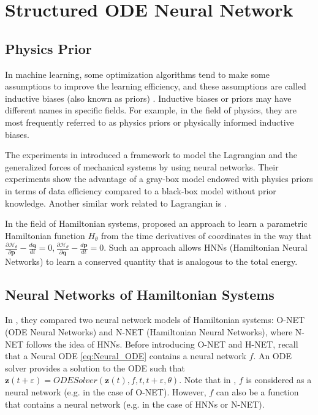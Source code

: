 \documentclass[
	parskip, 			   %
	twoside, 			   %
	DIV=14, 			   %
	BCOR=15.0mm, 		   %
	headsepline, 		   %
	open=right, 		   %
	captions=tableheading, %
	bibliography=totoc,    %
	numbers=noenddot       %
]{scrreprt}
\begin{document}
\clearpage
\chapter{Structured ODE Neural Network}
\label{ch:chapter6}
\section{Physics Prior}
In machine learning, some optimization algorithms tend to make some assumptions to improve the learning efficiency, and these assumptions are called inductive biases (also known as priors) \cite{mitchell1997machine}. Inductive biases or priors may have different names in specific fields. For example, in the field of physics, they are most frequently referred to as physics priors or physically informed inductive biases.

The experiments in \cite{gupta2019general} introduced a framework to model the Lagrangian and the generalized forces of mechanical systems by using neural networks. Their experiments show the advantage of a gray-box model endowed with physics priors in terms of data efficiency compared to a black-box model without prior knowledge. Another similar work related to Lagrangian is \cite{lutter2019deep}.

In the field of Hamiltonian systems, \cite{greydanus2019hamiltonian} proposed an approach to learn a parametric Hamiltonian function $H_{\theta}$ from the time derivatives of coordinates in the way that $\frac{\partial \mathcal{H}_{\theta}}{\partial \mathbf{p}} - \frac{d\mathbf{q}}{dt} = 0, \frac{\partial \mathcal{H}_{\theta}}{\partial \mathbf{q}} - \frac{d\mathbf{p}}{dt} = 0 $. Such an approach allows HNNs (Hamiltonian Neural Networks) to learn a conserved quantity that is analogous to the total energy.

\section{Neural Networks of Hamiltonian Systems}
In \cite{chen2019symplectic}, they compared two neural network models of Hamiltonian systems: O-NET (ODE Neural Networks) and N-NET (Hamiltonian Neural Networks), where N-NET follows the idea of HNNs. 
Before introducing O-NET and H-NET, recall that a Neural ODE \ref{eq:Neural_ODE} contains a neural network $f$. An ODE solver provides a solution to the ODE such that $\mathbf{z}(t+\varepsilon) = ODESolver(\mathbf{z}(t), f, t, t+\varepsilon , \theta)$. Note that in \cite{chen2019symplectic}, $f$ is considered as a neural network (e.g. in the case of O-NET). However, $f$ can also be a function that contains a neural network (e.g. in the case of HNNs or N-NET). 
\end{document}
